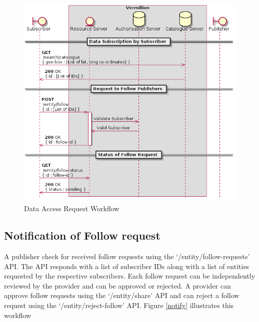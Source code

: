 \documentclass[conference, 10pt]{IEEEtran}
\begin{document}
\begin{figure}
\includegraphics[width=\linewidth, height=\linewidth, keepaspectratio]{follow-share.png}
\caption{Data Access Request Workflow}
\label{follow}
\end{figure}

\subsection{Notification of Follow request}

A publisher check for received follow requests using the ‘/entity/follow-requests’ API.  The API responds with a list of subscriber IDs along with a list of entities requested by the respective subscribers. Each follow request can be independently reviewed by the provider and can be approved or rejected. A provider can approve follow requests using the ‘/entity/share’ API and  can reject a follow request using the ‘/entity/reject-follow’ API. Figure \ref{notify} illustrates this workflow
\end{document}
